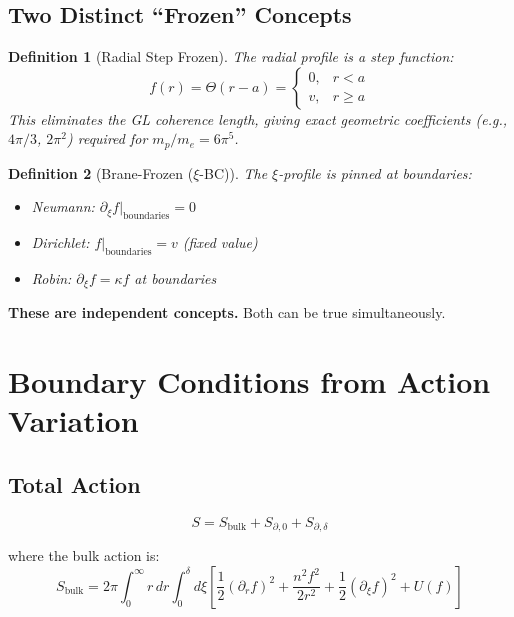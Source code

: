 \documentclass[11pt,a4paper]{article}
\newtheorem{definition}{Definition}
\begin{document}
\subsection{Two Distinct ``Frozen'' Concepts}

\begin{definition}[Radial Step Frozen]
The radial profile is a step function:
\begin{equation}
f(r) = \Theta(r - a) = \begin{cases} 0, & r < a \\ v, & r \geq a \end{cases}
\end{equation}
This eliminates the GL coherence length, giving exact geometric coefficients
(e.g., $4\pi/3$, $2\pi^2$) required for $m_p/m_e = 6\pi^5$.
\end{definition}

\begin{definition}[Brane-Frozen ($\xi$-BC)]
The $\xi$-profile is pinned at boundaries:
\begin{itemize}[nosep]
    \item Neumann: $\partial_\xi f|_{\text{boundaries}} = 0$
    \item Dirichlet: $f|_{\text{boundaries}} = v$ (fixed value)
    \item Robin: $\partial_\xi f = \kappa f$ at boundaries
\end{itemize}
\end{definition}

\textbf{These are independent concepts.} Both can be true simultaneously.

\section{Boundary Conditions from Action Variation}
\label{sec:bc-derivation}

\subsection{Total Action}

\begin{equation}
S = S_{\text{bulk}} + S_{\partial,0} + S_{\partial,\delta}
\end{equation}

where the bulk action is:
\begin{equation}
S_{\text{bulk}} = 2\pi \int_0^\infty r\,dr \int_0^\delta d\xi \left[
\frac{1}{2}(\partial_r f)^2 + \frac{n^2 f^2}{2r^2} + \frac{1}{2}(\partial_\xi f)^2 + U(f)
\right]
\end{equation}
\end{document}
